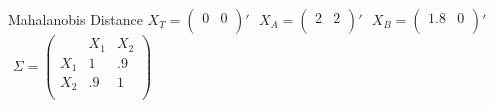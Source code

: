 \documentclass{beamer}
\numberwithin{equation}{section}
\begin{document}
\begin{frame}{Mahalanobis Distance}
\scriptsize
$X_T=\left(        \begin{array}{cc}          0 & 0 \\        \end{array}      \right)' $
$\,\, X_A=\left(                 \begin{array}{cc}                   2 &  2 \\                 \end{array}               \right)' $
$\,\, X_B=\left(                 \begin{array}{cc}                   1.8 &  0 \\                 \end{array}               \right)' $
$\,\,\Sigma=\left(                \begin{array}{ccc}           & X_1 & X_2 \\                  X_1 & 1 &  .9 \\                  X_2 & .9 & 1\\                \end{array}              \right)$


\end{frame}
\end{document}
